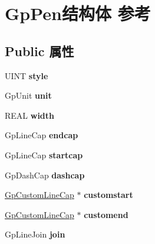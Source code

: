 \hypertarget{struct_gp_pen}{}\section{Gp\+Pen结构体 参考}
\label{struct_gp_pen}
\subsection*{Public 属性}
\begin{DoxyCompactItemize}
\item 
\mbox{\label{struct_gp_pen_ab61532646dcab3cf05bb7f259025d71b}} 
U\+I\+NT {\bfseries style}
\item 
\mbox{\label{struct_gp_pen_af48b1e018d5566ff1cd282f7e752a941}} 
Gp\+Unit {\bfseries unit}
\item 
\mbox{\label{struct_gp_pen_af5017d6ce67b728c42a5033c894ad87e}} 
R\+E\+AL {\bfseries width}
\item 
\mbox{\label{struct_gp_pen_ab2377aadd83bcdcd6eec2e1eb69ee12d}} 
Gp\+Line\+Cap {\bfseries endcap}
\item 
\mbox{\label{struct_gp_pen_a08affcae6deab8515d05feb84b90e091}} 
Gp\+Line\+Cap {\bfseries startcap}
\item 
\mbox{\label{struct_gp_pen_ad0b64c561b931f0cef3bd9e2c1216c6c}} 
Gp\+Dash\+Cap {\bfseries dashcap}
\item 
\mbox{\label{struct_gp_pen_afe59c2d257fe4fb579ebf5acc22b4d01}} 
\hyperlink{struct_gp_custom_line_cap}{Gp\+Custom\+Line\+Cap} $\ast$ {\bfseries customstart}
\item 
\mbox{\label{struct_gp_pen_a2770792bc1f950f79f691baefcb3a05d}} 
\hyperlink{struct_gp_custom_line_cap}{Gp\+Custom\+Line\+Cap} $\ast$ {\bfseries customend}
\item 
\mbox{\label{struct_gp_pen_ab8ed9f4be61aa2ef94b21c81173ed985}} 
Gp\+Line\+Join {\bfseries join}
\item 
\mbox{\label{struct_gp_pen_aa1c5100b8f77766af7aa827e08e35607}} 

\end{DoxyCompactItemize}
